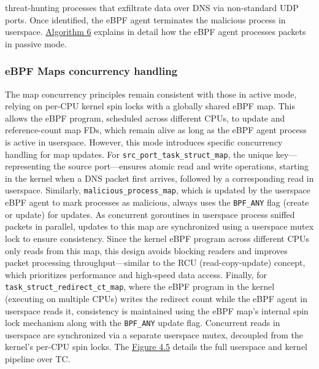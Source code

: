\documentclass [11pt, proquest] {uwthesis}[2020/02/24]
\begin{document}
threat-hunting processes that exfiltrate data over DNS via non-standard UDP ports. Once identified, the eBPF agent terminates the malicious process in userspace. \hyperref[sec:alg6]{Algorithm 6} explains in detail how the eBPF agent processes packets in passive mode.

\subsubsection{\textbf{eBPF Maps concurrency handling}}
\label{passive:sec3}
The map concurrency principles remain consistent with those in active mode, relying on per-CPU kernel spin locks with a globally shared eBPF map. This allows the eBPF program, scheduled across different CPUs, to update and reference-count map FDs, which remain alive as long as the eBPF agent process is active in userspace. However, this mode introduces specific concurrency handling for map updates. For \texttt{src\_port\_task\_struct\_map}, the unique key—representing the source port—ensures atomic read and write operations, starting in the kernel when a DNS packet first arrives, followed by a corresponding read in userspace. Similarly, \texttt{malicious\_process\_map}, which is updated by the userspace eBPF agent to mark processes as malicious, always uses the \texttt{BPF\_ANY} flag (create or update) for updates. As concurrent goroutines in userspace process sniffed packets in parallel, updates to this map are synchronized using a userspace mutex lock to ensure consistency. Since the kernel eBPF program across different CPUs only reads from this map, this design avoids blocking readers and improves packet processing throughput—similar to the RCU (read-copy-update) concept, which prioritizes performance and high-speed data access. Finally, for \texttt{task\_struct\_redirect\_ct\_map}, where the eBPF program in the kernel (executing on multiple CPUs) writes the redirect count while the eBPF agent in userspace reads it, consistency is maintained using the eBPF map’s internal spin lock mechanism along with the \texttt{BPF\_ANY} update flag. Concurrent reads in userspace are synchronized via a separate userspace mutex, decoupled from the kernel’s per-CPU spin locks. The \hyperref[sec:dp-passive-phase]{Figure 4.5} details the full userspace and kernel pipeline over TC. 
\end{document}

